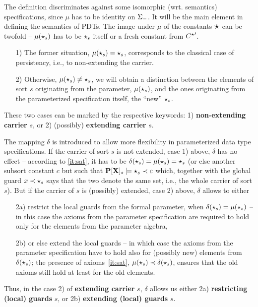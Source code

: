 The definition discriminates against some
isomorphic (wrt. semantics) specifications, since $\mu$ has to be identity on
$\Sigma_-$. 
It will be the main element in defining the
semantics of PDTs.
The image
under $\mu$ of the constants $\mbox{\Large{$\star$}}$ can be twofold -- 
$\mu(\star_s)$ has to be $\star_s$ itself or a
fresh constant from ${C^\star}'$.  
\begin{itemize}\MyLPar
\item[1)] The former situation, $\mu(\star_s)=\star_s$, corresponds to the
classical case of persistency, i.e., to  non-extending the carrier.
\item[2)] Otherwise, $\mu(\star_s)\not=\star_s$, we
will obtain a distinction between the elements of sort $s$ originating from
the parameter, $\mu(\star_s)$, and the ones originating from the parameterized specification
itself, the ``new'' $\star_s$. 
\end{itemize}
These two cases can be marked by the respective keywords: 1) {\bf
non-extending carrier} $s$, or 2) (possibly) {\bf extending carrier} $s$.

The mapping $\delta$ is introduced to allow more flexibility in
parameterized data type specifications. If the carrier of sort $s$ is not
extended, case 1) above, $\delta$ has no effect -- according to
\ref{it:sat}, it has to be $\delta(\star_s)=\mu(\star_s)=\star_s$ (or else
another subsort constant $c$ but such that ${\bf P[X]_\star}\models
\star_s\prec c$ which, together with the global guard $x\prec \star_s$ says
that the two denote the same set, i.e., the whole carrier of sort $s$). But if the carrier of $s$
is (possibly) extended, case 2) above, $\delta$ allows to
either 
\begin{itemize}\MyLPar
\item[2a)] restrict the local guards from the formal parameter, when
$\delta(\star_s)=\mu(\star_s)$ -- in this case the axioms from
the parameter specification are required to hold only for the elements from the
parameter algebra, 
\item[2b)] 
or else extend the local guards -- in which case the axioms from the parameter
specification have to hold also for (possibly new) elements from
$\delta(\star_s)$; the presence of axioms~\ref{it:sat}, $\mu(\star_s) \prec
\delta(\star_s)$, ensures that the old axioms still hold at least for the old elements.
\end{itemize}
Thus, in the case 2) of {\bf extending carrier} $s$, 
$\delta$ allows us either 2a) {\bf restricting (local) guards} $s$,
or 2b) {\bf extending (local) guards} $s$.

